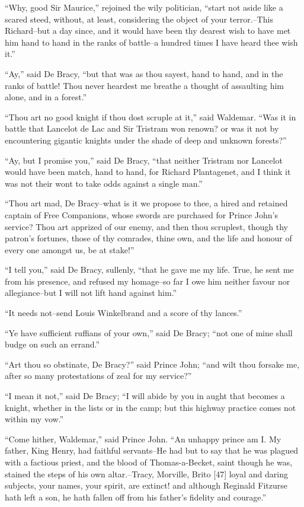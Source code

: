 ``Why, good Sir Maurice,'' rejoined the wily politician, ``start not
aside like a scared steed, without, at least, considering the object of
your terror.--This Richard--but a day since, and it would have been thy
dearest wish to have met him hand to hand in the ranks of battle--a
hundred times I have heard thee wish it.''

``Ay,'' said De Bracy, ``but that was as thou sayest, hand to hand, and
in the ranks of battle! Thou never heardest me breathe a thought of
assaulting him alone, and in a forest.''

``Thou art no good knight if thou dost scruple at it,'' said Waldemar.
``Was it in battle that Lancelot de Lac and Sir Tristram won renown? or
was it not by encountering gigantic knights under the shade of deep and
unknown forests?''

``Ay, but I promise you,'' said De Bracy, ``that neither Tristram nor
Lancelot would have been match, hand to hand, for Richard Plantagenet,
and I think it was not their wont to take odds against a single man.''

``Thou art mad, De Bracy--what is it we propose to thee, a hired and
retained captain of Free Companions, whose swords are purchased for
Prince John's service? Thou art apprized of our enemy, and then thou
scruplest, though thy patron's fortunes, those of thy comrades, thine
own, and the life and honour of every one amongst us, be at stake!''

``I tell you,'' said De Bracy, sullenly, ``that he gave me my life.
True, he sent me from his presence, and refused my homage--so far I owe
him neither favour nor allegiance--but I will not lift hand against
him.''

``It needs not--send Louis Winkelbrand and a score of thy lances.''

``Ye have sufficient ruffians of your own,'' said De Bracy; ``not one of
mine shall budge on such an errand.''

``Art thou so obstinate, De Bracy?'' said Prince John; ``and wilt thou
forsake me, after so many protestations of zeal for my service?''

``I mean it not,'' said De Bracy; ``I will abide by you in aught that
becomes a knight, whether in the lists or in the camp; but this highway
practice comes not within my vow.''

``Come hither, Waldemar,'' said Prince John. ``An unhappy prince am I.
My father, King Henry, had faithful servants--He had but to say that he
was plagued with a factious priest, and the blood of Thomas-a-Becket,
saint though he was, stained the steps of his own altar.--Tracy,
Morville, Brito {[}47{]} loyal and daring subjects, your names, your
spirit, are extinct! and although Reginald Fitzurse hath left a son, he
hath fallen off from his father's fidelity and courage.''

